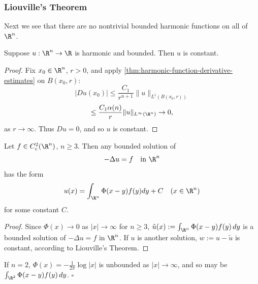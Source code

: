 \subsubsection{Liouville's Theorem}
\label{sec:laplace-liouvilles-theorem}

Next we see that there are no nontrivial bounded harmonic functions on all of $\R^n$.

\begin{theorem}
\label{thm:liouville-theorem-harmonic}
Suppose $u : \R^n \to \R$ is harmonic and bounded. Then $u$ is constant.
\end{theorem}

\begin{proof}
Fix $x_0 \in \R^n$, $r > 0$, and apply \cref{thm:harmonic-function-derivative-estimates} on $B(x_0, r)$:
$$|Du(x_0)| \leq \frac{C_1}{r^{n+1}}\|u\|_{L^1(B(x_0,r))}$$
$$\leq \frac{C_1\alpha(n)}{r}\|u\|_{L^\infty(\R^n)} \to 0,$$
as $r \to \infty$. Thus $Du = 0$, and so $u$ is constant.
\end{proof}

\begin{theorem}
\label{thm:representation-formula-bounded-solutions}
Let $f \in C^2_c(\R^n)$, $n \geq 3$. Then any bounded solution of
$$-\Delta u = f \quad \text{in } \R^n$$
has the form
$$u(x) = \int_{\R^n} \Phi(x - y)f(y)dy + C \quad (x \in \R^n)$$
for some constant $C$.
\end{theorem}

\begin{proof}
Since $\Phi(x) \to 0$ as $|x| \to \infty$ for $n \geq 3$, $\tilde{u}(x) := \int_{\R^n} \Phi(x-y)f(y)\,dy$ is a bounded solution of $-\Delta u = f$ in $\R^n$. If $u$ is another solution, $w := u - \tilde{u}$ is constant, according to Liouville's Theorem.
\end{proof}

\begin{remark}
\label{rem:representation-formula-n2-unbounded}
If $n = 2$, $\Phi(x) = -\frac{1}{2\pi}\log|x|$ is unbounded as $|x| \to \infty$, and so may be $\int_{\R^2} \Phi(x-y)f(y)\,dy$. $\square$
\end{remark}

